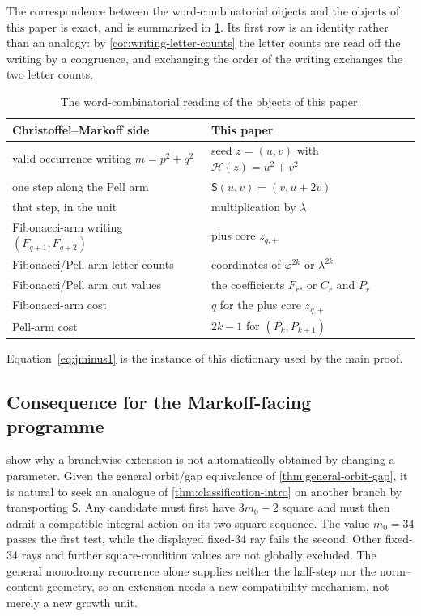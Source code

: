 The correspondence between the word-combinatorial objects and the objects of
this paper is exact, and is summarized in \cref{tab:dictionary}. Its first row
is an identity rather than an analogy: by \cref{cor:writing-letter-counts} the
letter counts are read off the writing by a congruence, and exchanging the
order of the writing exchanges the two letter counts.

\begin{table}[htbp]
\centering
\caption{The word-combinatorial reading of the objects of this paper.}
\label{tab:dictionary}
\begin{tabular}{@{}ll@{}}
\toprule
Christoffel--Markoff side & This paper\\
\midrule
valid occurrence writing $m=p^2+q^2$ & seed $z=(u,v)$ with $\mathcal H(z)=u^2+v^2$\\
one step along the Pell arm & $\mathsf S(u,v)=(v,u+2v)$\\
that step, in the unit & multiplication by $\lambda$\\
Fibonacci-arm writing $(F_{q+1},F_{q+2})$ & plus core $z_{q,+}$\\
Fibonacci/Pell arm letter counts & coordinates of $\varphi^{2k}$ or $\lambda^{2k}$\\
Fibonacci/Pell arm cut values & the coefficients $F_r$, or $C_r$ and $P_r$\\
Fibonacci-arm cost & $q$ for the plus core $z_{q,+}$\\
Pell-arm cost & $2k-1$ for $(P_k,P_{k+1})$\\
\bottomrule
\end{tabular}
\end{table}

Equation~\eqref{eq:jminus1} is the instance of this dictionary used by the
main proof.

\subsection{Consequence for the Markoff-facing programme}

 show why a branchwise
extension is not automatically obtained by changing a parameter. Given the general
orbit/gap equivalence of \cref{thm:general-orbit-gap}, it is natural to seek an
analogue of \cref{thm:classification-intro} on another branch by transporting
$\mathsf S$. Any candidate must first have $3m_0-2$ square and must then admit
a compatible integral action on its two-square sequence. The value $m_0=34$
passes the first test, while the displayed fixed-$34$ ray fails the second.
Other fixed-$34$ rays and further square-condition values are not globally
excluded. The general monodromy recurrence alone supplies neither the
half-step nor the norm--content geometry, so an extension needs a new
compatibility mechanism, not merely a new growth unit.
